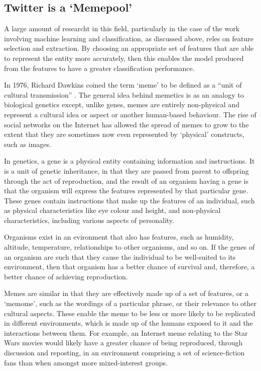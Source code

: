 \subsection{Twitter is a `Memepool'}
A large amount of researcht in this field, particularly in the case of the work involving machine learning and classification, as discussed above, reles on feature selection and extraction. By choosing an appropriate set of features that are able to represent the entity more accurately, then this enables the model produced from the features to have a greater classification performance.  

In 1976, Richard Dawkins coined the term `meme' to be defined as a ``unit of cultural transmission'' \cite{dawkins76}. The general idea behind memetics is as an analogy to biological genetics except, unlike genes, memes are entirely non-physical and represent a cultural idea or aspect or another human-based behaviour. The rise of social networks on the Internet has allowed the spread of memes to grow to the extent that they are sometimes now even represented by `physical' constructs, such as images.

In genetics, a gene is a physical entity containing information and instructions. It is a unit of genetic inheritance, in that they are passed from parent to offspring through the act of reproduction, and the result of an organism having a gene is that the organism will express the features represented by that particular gene. These genes contain instructions that make up the features of an individual, such as physical characteristics like eye colour and height, and non-physical characteristics, including various aspects of personality.

Organisms exist in an evironment that also has features, such as humidity, altitude, temperature, relationships to other organisms, and so on. If the genes of an organism are such that they cause the individual to be well-suited to its environment, then that organism has a better chance of survival and, therefore, a better chance of achieving reproduction.

Memes are similar in that they are effectively made up of a set of features, or a `memome', such as the wordings of a particular phrase, or their relevance to other cultural aspects. These enable the meme to be less or more likely to be replicated in different environments, which is made up of the humans exposed to it and the interactions between them. For example, an Internet meme relating to the Star Wars movies would likely have a greater chance of being reproduced, through discussion and reposting, in an environment comprising a set of science-fiction fans than when amongst more mixed-interest groups.

